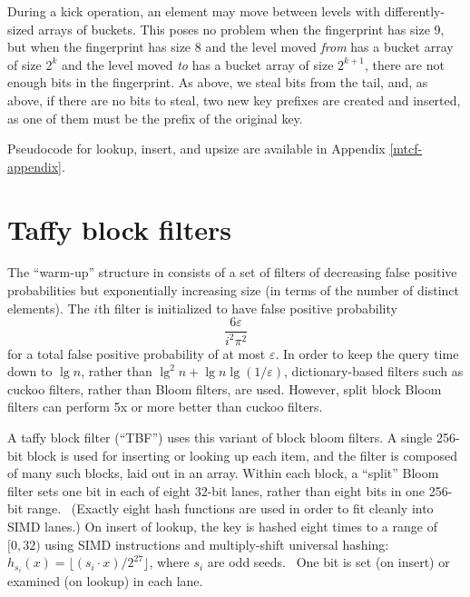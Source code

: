 \documentclass[manuscript,screen,review]{acmart}
\begin{document}

During a kick operation, an element may move between levels with differently-sized arrays of buckets.
This poses no problem when the fingerprint has size 9, but when the fingerprint has size 8 and the level moved {\em from} has a bucket array of size $2^k$ and the level moved {\em to} has a bucket array of size $2^{k+1}$,  there are not enough bits in the fingerprint.
As above, we steal bits from the tail, and, as above, if there are no bits to steal, two new key prefixes are created and inserted, as one of them must be the prefix of the original key.

Pseudocode for lookup, insert, and upsize are available in Appendix \ref{mtcf-appendix}.

\section{Taffy block filters}
\label{pbf}

The ``warm-up'' structure in \cite{psw} consists of a set of filters of decreasing false positive probabilities but exponentially increasing size (in terms of the number of distinct elements).
The $i$th filter is initialized to have false positive probability
\[
\frac{6 \varepsilon}  {i^2 \pi^2}
\]
for a total false positive probability of at most $\varepsilon$.
In order to keep the query time down to $\lg n$, rather than $\lg^2n + \lg n \lg (1/\varepsilon)$, dictionary-based filters such as cuckoo filters, rather than Bloom filters, are used.
However, split block Bloom filters can perform 5x or more better than cuckoo filters. \cite{cuckoo-filter-github}

A taffy block filter (``TBF'') uses this variant of block bloom filters. \cite{block-bloom, ultra-fast}
A single 256-bit block is used for inserting or looking up each item, and the filter is composed of many such blocks, laid out in an array.
Within each block, a ``split'' Bloom filter sets one bit in each of eight 32-bit lanes, rather than eight bits in one 256-bit range.~\cite{split-bloom}
(Exactly eight hash functions are used in order to fit cleanly into SIMD lanes.)
On insert of lookup, the key is hashed eight times to a range of $[0,32)$ using SIMD instructions and multiply-shift universal hashing: $h_{s_i}(x) = \lfloor(s_i \cdot x) / 2^{27}\rfloor$, where $s_i$ are odd seeds.~\cite{multiply-shift}
One bit is set (on insert) or examined (on lookup) in each lane.
\end{document}
